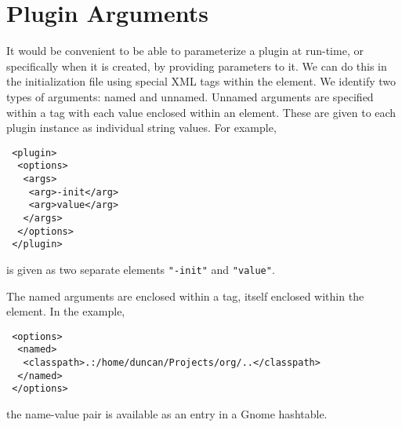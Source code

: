 \documentclass{article}
\begin{document}
\section{Plugin Arguments}
It would be convenient to be able to parameterize a plugin at
run-time, or specifically when it is created, by providing parameters
to it.  We can do this in the initialization file using special XML
tags within the  element.  We identify two types of
arguments: named and unnamed.  Unnamed arguments are specified within
a  tag with each value enclosed within an 
element.  These are given to each plugin instance as
individual string values.
For example,
\begin{verbatim}
 <plugin>
  <options>
   <args>
    <arg>-init</arg>
    <arg>value</arg>
   </args>
  </options>
 </plugin>
\end{verbatim}
is given as two separate elements
\texttt{"-init"} and \texttt{"value"}.

The named arguments are enclosed within a  tag, itself
enclosed within the  element.
In the example,
\begin{verbatim}
 <options>
  <named>
   <classpath>.:/home/duncan/Projects/org/..</classpath>
  </named>
 </options>
\end{verbatim}
the name-value pair is available as an entry in
a Gnome hashtable.





\begin{comment}
\section{Issues}
Configuration

Debugging dynamically loaded code.

The plugin mechanism requires XML.
\end{comment}
\end{document}
